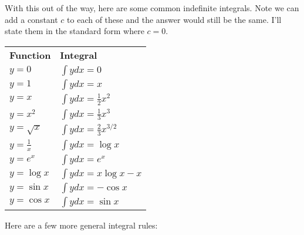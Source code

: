 \documentclass[
  letterpaper,
  DIV=11,
  numbers=noendperiod]{scrreprt}
\begin{document}
With this out of the way, here are some common indefinite integrals.
Note we can add a constant \(c\) to each of these and the answer would
still be the same. I'll state them in the standard form where \(c=0\).

\begin{longtable}[]{@{}
  >{\raggedright\arraybackslash}p{}
  >{\raggedright\arraybackslash}p{}@{}}
\toprule()
\endhead
\textbf{Function} & \textbf{Integral} \\
\(y = 0\) & \(\int y dx = 0\) \\
\(y = 1\) & \(\int y dx = x\) \\
\(y = x\) & \(\int y dx = \frac{1}{2}x^2\) \\
\(y = x^2\) & \(\int y dx = \frac{1}{3}x^3\) \\
\(y = \sqrt{x}\) & \(\int y dx = \frac{2}{3} x^{3/2}\) \\
\(y = \frac{1}{x}\) & \(\int y dx = \log{x}\) \\
\(y = e^x\) & \(\int y dx = e^x\) \\
\(y = \log{x}\) & \(\int y dx = x \log{x} - x\) \\
\(y = \sin{x}\) & \(\int y dx = -\cos{x}\) \\
\(y = \cos{x}\) & \(\int y dx = \sin{x}\) \\
\bottomrule()
\end{longtable}

Here are a few more general integral rules:
\end{document}
